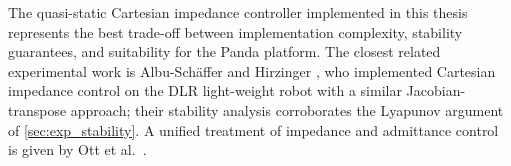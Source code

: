 The quasi-static Cartesian impedance controller implemented in this
thesis represents the best trade-off between implementation complexity,
stability guarantees, and suitability for the Panda platform.
The closest related experimental work is Albu-Sch\"affer and Hirzinger
\cite{Albu2003}, who implemented Cartesian impedance control on the
DLR light-weight robot with a similar Jacobian-transpose approach;
their stability analysis corroborates the Lyapunov argument of
\cref{sec:exp_stability}.
A unified treatment of impedance and admittance control is given by
Ott et al.\ \cite{Ott2008}.

